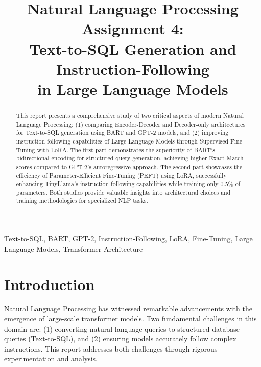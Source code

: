\documentclass[conference]{IEEEtran}
\begin{document}
\title{Natural Language Processing Assignment 4:\\
Text-to-SQL Generation and Instruction-Following\\
in Large Language Models}

\author{
}

\maketitle

\begin{abstract}
This report presents a comprehensive study of two critical aspects of modern Natural Language Processing: (1) comparing Encoder-Decoder and Decoder-only architectures for Text-to-SQL generation using BART and GPT-2 models, and (2) improving instruction-following capabilities of Large Language Models through Supervised Fine-Tuning with LoRA. The first part demonstrates the superiority of BART's bidirectional encoding for structured query generation, achieving higher Exact Match scores compared to GPT-2's autoregressive approach. The second part showcases the efficiency of Parameter-Efficient Fine-Tuning (PEFT) using LoRA, successfully enhancing TinyLlama's instruction-following capabilities while training only 0.5\% of parameters. Both studies provide valuable insights into architectural choices and training methodologies for specialized NLP tasks.
\end{abstract}

\begin{IEEEkeywords}
Text-to-SQL, BART, GPT-2, Instruction-Following, LoRA, Fine-Tuning, Large Language Models, Transformer Architecture
\end{IEEEkeywords}

\section{Introduction}
Natural Language Processing has witnessed remarkable advancements with the emergence of large-scale transformer models. Two fundamental challenges in this domain are: (1) converting natural language queries to structured database queries (Text-to-SQL), and (2) ensuring models accurately follow complex instructions. This report addresses both challenges through rigorous experimentation and analysis.
\end{document}
